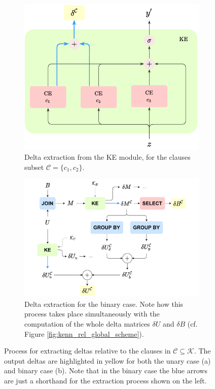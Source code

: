  \begin{figure}
 	\centering
 	\begin{subfigure}{.4\textwidth}
 		\centering
 		\includegraphics[width=\linewidth]{figures/deltas_extraction_unary.pdf}
 		\caption{Delta extraction from the KE module, for the clauses subset $\mathcal{C}=\{c_1,c_2\}$.}
 		\label{fig:delta_extraction_unary}	
 	\end{subfigure}%
  	\begin{subfigure}{.6\textwidth}
 	\centering
 	\includegraphics[width=\linewidth]{figures/delta_extractions.pdf}
 	\caption{Delta extraction for the binary case. Note how this process takes place simultaneously with the computation of the whole delta matrices $\delta U$ and $\delta B$ (cf. Figure \ref{fig:kenn_rel_global_scheme}).}
 	\label{fig:delta_extraction_binary}
 \end{subfigure}%
\caption{Process for extracting deltas relative to the clauses in $\mathcal{C \subseteq \mathcal{K}}$. The output deltas are highlighted in yellow for both the unary case (a) and binary case (b). Note that in the binary case the blue arrows are just a shorthand for the extraction process shown on the left.}
\label{fig:delta_extraction}
 \end{figure}
